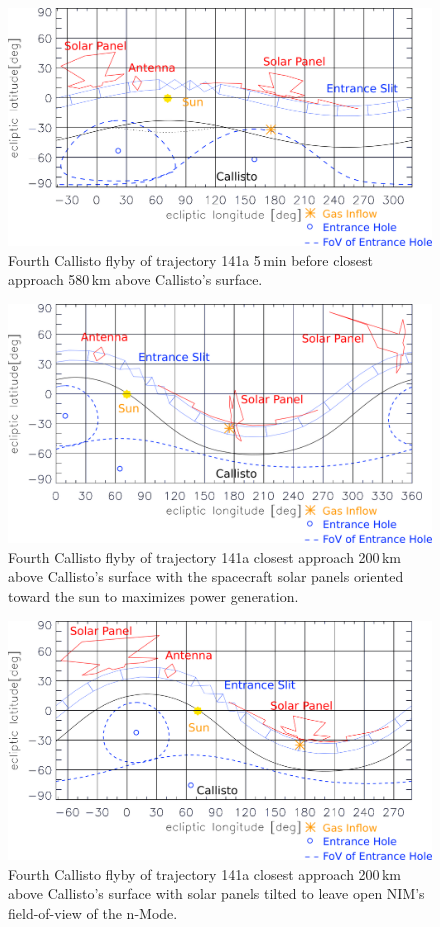	\begin{figure}[h!]
		\centering
		\includegraphics[width = .7\textwidth]{Bilder/NIM_pointing_2031JAN15194700.png}
		\caption{Fourth Callisto flyby of trajectory 141a \cite{SOC_Crema3p2} 5\,min before closest approach 580\,km above Callisto's surface.}
		\label{fig:FlybyCal1947}
	\end{figure}
	\begin{figure}[h!]
		\centering
		\includegraphics[width = .7\textwidth]{Bilder/NIM_pointing_2031JAN15195200_tilt.png}
		\caption{Fourth Callisto flyby of trajectory 141a \cite{SOC_Crema3p2} closest approach 200\,km above Callisto's surface with the spacecraft solar panels oriented toward the sun to maximizes power generation.}
		\label{fig:FlybyCal1952sol}
	\end{figure}
	\begin{figure}[h!]
		\centering
		\includegraphics[width = .7\textwidth]{Bilder/NIM_pointing_2031JAN15195200.png}
		\caption{Fourth Callisto flyby of trajectory 141a \cite{SOC_Crema3p2} closest approach 200\,km above Callisto's surface with solar panels tilted to leave open NIM's field-of-view of the n-Mode.}
		\label{fig:FlybyCal1952}
	\end{figure}
